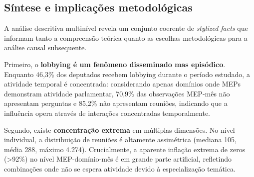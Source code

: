 


\subsection{Síntese e implicações metodológicas}

A análise descritiva multinível revela um conjunto coerente de \textit{stylized facts} que informam tanto a compreensão teórica quanto as escolhas metodológicas para a análise causal subsequente.


Primeiro, o \textbf{lobbying é um fenômeno disseminado mas episódico}. Enquanto 46,3\% dos deputados recebem lobbying durante o período estudado, a atividade temporal é concentrada: considerando apenas domínios onde MEPs demonstram atividade parlamentar, 70,9\% das observações MEP-mês não apresentam perguntas e 85,2\% não apresentam reuniões, indicando que a influência opera através de interações concentradas temporalmente.

Segundo, existe \textbf{concentração extrema} em múltiplas dimensões. No nível individual, a distribuição de reuniões é altamente assimétrica (mediana 105, média 288, máximo 4.274). Crucialmente, a aparente inflação extrema de zeros (>92\%) no nível MEP-domínio-mês é em grande parte artificial, refletindo combinações onde não se espera atividade devido à especialização temática.

